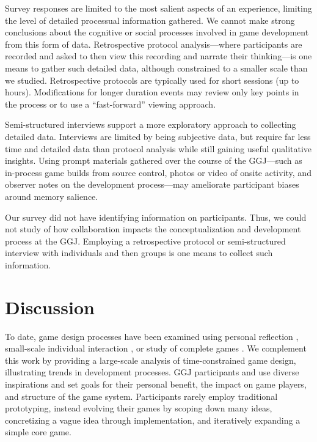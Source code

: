\documentclass{sig-alternate}
\begin{document}
Survey responses are limited to the most salient aspects of an experience, limiting the level of detailed processual information gathered. We cannot make strong conclusions about the cognitive or social processes involved in game development from this form of data. Retrospective protocol analysis---where participants are recorded and asked to then view this recording and narrate their thinking---is one means to gather such detailed data, although constrained to a smaller scale than we studied. Retrospective protocols are typically used for short sessions (up to hours). Modifications for longer duration events may review only key points in the process or to use a ``fast-forward'' viewing approach. 

Semi-structured interviews support a more exploratory approach to collecting detailed data. Interviews are limited by being subjective data, but require far less time and detailed data than protocol analysis while still gaining useful qualitative insights. Using prompt materials gathered over the course of the GGJ---such as in-process game builds from source control, photos or video of onsite activity, and observer notes on the development process---may ameliorate participant biases around memory salience.

Our survey did not have identifying information on participants. Thus, we could not study of how collaboration impacts the conceptualization and development process at the GGJ. Employing a retrospective protocol or semi-structured interview with individuals and then groups is one means to collect such information.


\section{Discussion}
To date, game design processes have been examined using personal reflection \cite{anthropy2012:zinesters,hunicke2004:mda}, small-scale individual interaction \cite{nelson2009:reqanal}, or study of complete games \cite{bogost2011:howto}. We complement this work by providing a large-scale analysis of time-constrained game design, illustrating trends in development processes. 
GGJ participants and use diverse inspirations and set goals for their personal benefit, the impact on game players, and structure of the game system.
Participants rarely employ traditional prototyping, instead evolving their games by scoping down many ideas, concretizing a vague idea through implementation, and iteratively expanding a simple core game.
\end{document}
